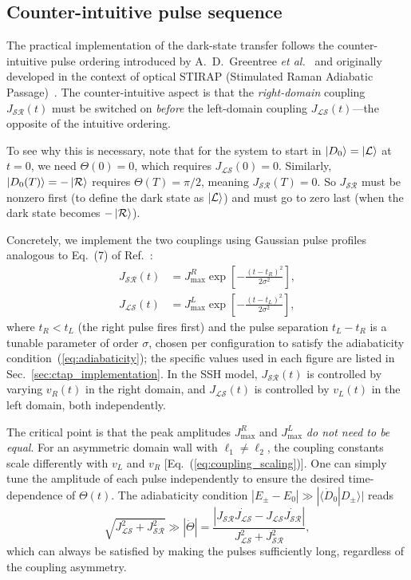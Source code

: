 \documentclass[
  reprint,
  amsmath,
  amssymb,
  aps,
  prb,
  floatfix,
  longbibliography,
]{revtex4-2}
\newcommand{\JLS}{J_{\mathcal{LS}}}
\newcommand{\JSR}{J_{\mathcal{SR}}}
\newcommand{\ketL}{\ket{\mathcal{L}}}
\newcommand{\ketR}{\ket{\mathcal{R}}}
\begin{document}
\subsection{Counter-intuitive pulse sequence}
\label{sec:ctap_pulse}

The practical implementation of the dark-state transfer follows the counter-
intuitive pulse ordering introduced by A.~D.~Greentree \textit{et al.}~\cite{Greentree2004}
and originally developed in the context of optical STIRAP (Stimulated Raman
Adiabatic Passage)~\cite{Vitanov2017, GueryOdelin2019}. The counter-intuitive aspect is
that the \emph{right-domain} coupling $\JSR(t)$ must be switched on
\emph{before} the left-domain coupling $\JLS(t)$---the opposite of the
intuitive ordering.

To see why this is necessary, note that for the system to start in $\ket{D_0}
= \ketL$ at $t = 0$, we need $\Theta(0) = 0$, which requires $\JLS(0) = 0$.
Similarly, $\ket{D_0(T)} = -\ketR$ requires $\Theta(T) = \pi/2$, meaning
$\JSR(T) = 0$. So $\JSR$ must be nonzero first (to define the dark state
as $\ketL$) and must go to zero last (when the dark state becomes $-\ketR$).

Concretely, we implement the two couplings using Gaussian pulse profiles
analogous to Eq.~(7) of Ref.~\cite{Greentree2004}:
\begin{align}
  \JSR(t) &= J_{\max}^R \exp\!\left[
    -\frac{(t - t_R)^2}{2\sigma^2}\right], \label{eq:ctap_jsr} \\
  \JLS(t) &= J_{\max}^L \exp\!\left[
    -\frac{(t - t_L)^2}{2\sigma^2}\right], \label{eq:ctap_jls}
\end{align}
where $t_R < t_L$ (the right pulse fires first) and the pulse separation
$t_L - t_R$ is a tunable parameter of order $\sigma$, chosen per configuration
to satisfy the adiabaticity condition~(\ref{eq:adiabaticity}); the specific
values used in each figure are listed in Sec.~\ref{sec:ctap_implementation}.
In the SSH model, $\JSR(t)$ is controlled by varying $v_R(t)$ in the right
domain, and $\JLS(t)$ is controlled by $v_L(t)$ in the left domain, both
independently.

The critical point is that the peak amplitudes $J_{\max}^R$ and $J_{\max}^L$
\emph{do not need to be equal}. For an asymmetric domain wall with $\ell_1
\neq \ell_2$, the coupling constants scale differently with $v_L$ and $v_R$
[Eq.~(\ref{eq:coupling_scaling})]. One can simply tune the amplitude of each
pulse independently to ensure the desired time-dependence of $\Theta(t)$.
The adiabaticity condition $|E_\pm - E_0| \gg |\langle \dot{D}_0 | D_\pm \rangle|$
reads~\cite{Greentree2004}
\begin{equation}
  \sqrt{\JLS^2 + \JSR^2} \gg
  |\dot{\Theta}|
  = \frac{|\JSR\dot{\JLS} - \JLS\dot{\JSR}|}{\JLS^2 + \JSR^2},
  \label{eq:adiabaticity}
\end{equation}
which can always be satisfied by making the pulses sufficiently long, regardless
of the coupling asymmetry.
\end{document}
